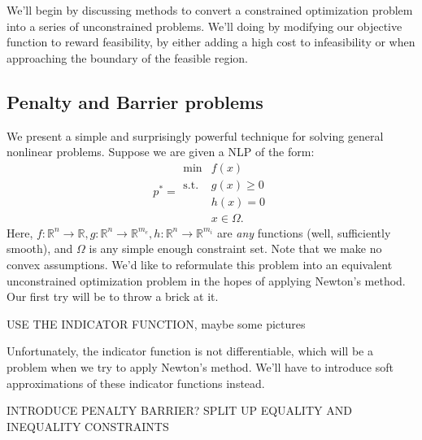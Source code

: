 \documentclass{article}
\numberwithin{equation}{section}
\theoremstyle{definition}
\newcommand{\bR}{\mathbb{R}}
\newcommand{\tst}{\text{s.t.}}
\begin{document}
We'll begin by discussing methods to convert a constrained optimization problem into a series of unconstrained problems. We'll doing by modifying our objective function to reward feasibility, by either adding a high cost to infeasibility or when approaching the boundary of the feasible region.
\subsection{Penalty and Barrier problems}
We present a simple and surprisingly powerful technique for solving general nonlinear problems. Suppose we are given a NLP of the form:
\begin{equation}
    \label{eqpbnlp}
    p^*=\begin{array}{cc}
         \min & f(x)  \\
         \tst & g(x)\ge 0\\
              & h(x)=0\\
              & x\in\Omega.
    \end{array}
\end{equation}
Here, $f:\bR^n\to\bR, g:\bR^n\to\bR^{m_e}, h:\bR^n\to\bR^{m_i}$ are \textit{any} functions (well, sufficiently smooth), and $\Omega$ is any simple enough constraint set. Note that we make no convex assumptions. We'd like to reformulate this problem into an equivalent unconstrained optimization problem in the hopes of applying Newton's method. Our first try will be to throw a brick at it.

USE THE INDICATOR FUNCTION, maybe some pictures

Unfortunately, the indicator function is not differentiable, which will be a problem when we try to apply Newton's method. We'll have to introduce soft approximations of these indicator functions instead.

INTRODUCE PENALTY BARRIER? SPLIT UP EQUALITY AND INEQUALITY CONSTRAINTS
\end{document}
